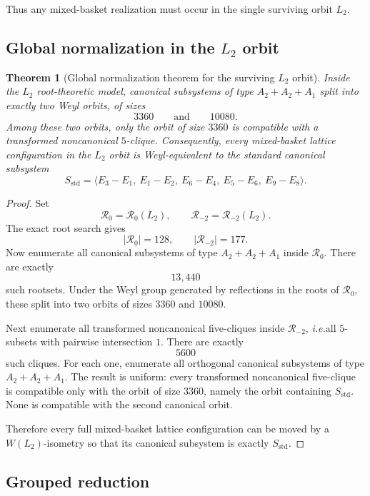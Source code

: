 \documentclass[11pt]{article}
\newtheorem{theorem}{Theorem}[section]
\theoremstyle{definition}
\newcommand{\ie}{\emph{i.e.}}
\begin{document}
Thus any mixed-basket realization must occur in the single surviving orbit $L_2$.

\subsection{Global normalization in the $L_2$ orbit}

\begin{theorem}[Global normalization theorem for the surviving $L_2$ orbit]\label{thm:L2-global-normalization}
Inside the $L_2$ root-theoretic model, canonical subsystems of type $A_2+A_2+A_1$ split into exactly two Weyl orbits, of sizes
\[
3360\qquad\text{and}\qquad 10080.
\]
Among these two orbits, only the orbit of size $3360$ is compatible with a transformed noncanonical $5$-clique. Consequently, every mixed-basket lattice configuration in the $L_2$ orbit is Weyl-equivalent to the standard canonical subsystem
\[
S_{\mathrm{std}}=\langle E_3-E_1,\ E_1-E_2,\ E_6-E_4,\ E_5-E_6,\ E_9-E_8\rangle.
\]
\end{theorem}

\begin{proof}
Set
\[
\mathcal R_0=\mathcal R_0(L_2),\qquad \mathcal R_{-2}=\mathcal R_{-2}(L_2).
\]
The exact root search gives
\[
|\mathcal R_0|=128,
\qquad
|\mathcal R_{-2}|=177.
\]
Now enumerate all canonical subsystems of type $A_2+A_2+A_1$ inside $\mathcal R_0$. There are exactly
\[
13{,}440
\]
such rootsets. Under the Weyl group generated by reflections in the roots of $\mathcal R_0$, these split into two orbits of sizes $3360$ and $10080$.

Next enumerate all transformed noncanonical five-cliques inside $\mathcal R_{-2}$, 
\ie all $5$-subsets with pairwise intersection $1$. There are exactly
\[
5600
\]
such cliques. For each one, enumerate all orthogonal canonical subsystems of type $A_2+A_2+A_1$. The result is uniform: every transformed noncanonical five-clique is compatible only with the orbit of size $3360$, namely the orbit containing $S_{\mathrm{std}}$. None is compatible with the second canonical orbit.

Therefore every full mixed-basket lattice configuration can be moved by a $W(L_2)$-isometry so that its canonical subsystem is exactly $S_{\mathrm{std}}$.
\end{proof}

\subsection{Grouped reduction}
\end{document}
